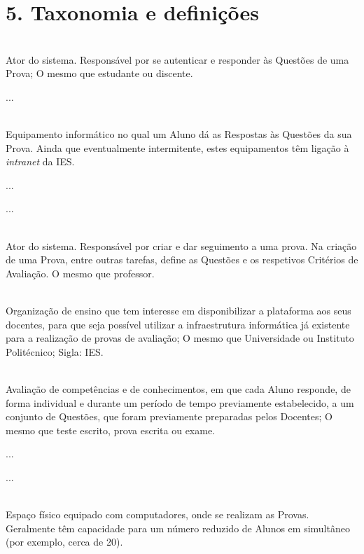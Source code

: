 \chapter*{5. Taxonomia e definições}
\newcommand{\define}[2]{\item[#1] \hfill \\ #2}


\begin{description}    
{\TextoCor
    \define{Aluno}
    {Ator do sistema. Responsável por se autenticar e responder às Questões de uma Prova; O mesmo que estudante ou discente.}
    
}
    {...}

{\TextoCor
    \define{Computador}
    {Equipamento informático no qual um Aluno dá as Respostas às Questões da sua Prova. Ainda que eventualmente intermitente, estes equipamentos têm ligação à \textit{intranet} da IES.}

}
    {...}
    
{\TextoCor
}    
    {...}
    
 {\TextoCor
   \define{Docente}
    {Ator do sistema. Responsável por criar e dar seguimento a uma prova. Na criação de uma Prova, entre outras tarefas, define as Questões e os respetivos Critérios de Avaliação. O mesmo que professor.}
    
    \define{Instituição de Ensino Superior}
    {Organização de ensino que tem interesse em disponibilizar a plataforma aos seus docentes, para que seja possível utilizar a infraestrutura informática já existente para a realização de provas de avaliação; O mesmo que Universidade ou Instituto Politécnico; Sigla: IES.}

    \define{Prova de avaliação}
    {Avaliação de competências e de conhecimentos, em que cada Aluno responde, de forma individual e durante um período de tempo previamente estabelecido, a um conjunto de Questões, que foram previamente preparadas pelos Docentes; O mesmo que teste escrito, prova escrita ou exame.}
}

{\TextoCor
}    
    {...}
    
{\TextoCor
}    
    {...}

 {\TextoCor
   \define{Sala}
   
    {Espaço físico equipado com computadores, onde se realizam as Provas. Geralmente têm capacidade para um número reduzido de Alunos em simultâneo  (por exemplo, cerca de 20).}
}

\end{description}

